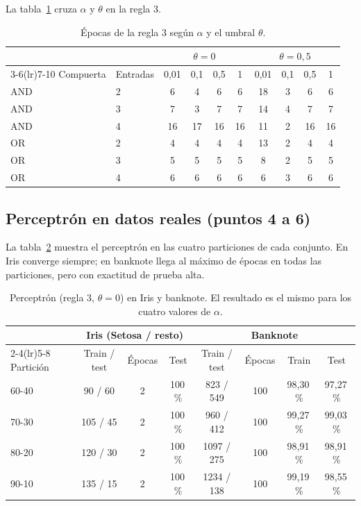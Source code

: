 \documentclass[11pt,letterpaper]{article}
\begin{document}
La tabla~\ref{tab:alfa} cruza $\alpha$ y $\theta$ en la regla 3.

\begin{table}[H]
\centering
\caption{Épocas de la regla 3 según $\alpha$ y el umbral $\theta$.}\label{tab:alfa}
\begin{tabular}{llcccccccc}
\toprule
& & \multicolumn{4}{c}{$\theta = 0$} & \multicolumn{4}{c}{$\theta = 0{,}5$} \\
\cmidrule(lr){3-6}\cmidrule(lr){7-10}
Compuerta & Entradas & 0,01 & 0,1 & 0,5 & 1 & 0,01 & 0,1 & 0,5 & 1 \\
\midrule
AND & 2 & 6 & 4 & 6 & 6 & 18 & 3 & 6 & 6 \\
AND & 3 & 7 & 3 & 7 & 7 & 14 & 4 & 7 & 7 \\
AND & 4 & 16 & 17 & 16 & 16 & 11 & 2 & 16 & 16 \\
OR & 2 & 4 & 4 & 4 & 4 & 13 & 2 & 4 & 4 \\
OR & 3 & 5 & 5 & 5 & 5 & 8 & 2 & 5 & 5 \\
OR & 4 & 6 & 6 & 6 & 6 & 6 & 3 & 6 & 6 \\
\bottomrule
\end{tabular}
\end{table}

\subsection{Perceptrón en datos reales (puntos 4 a 6)}

La tabla~\ref{tab:perc_datos} muestra el perceptrón en las cuatro particiones de cada conjunto. En Iris converge siempre; en banknote llega al máximo de épocas en todas las particiones, pero con exactitud de prueba alta.

\begin{table}[H]
\centering
\caption{Perceptrón (regla 3, $\theta = 0$) en Iris y banknote. El resultado es el mismo para los cuatro valores de $\alpha$.}\label{tab:perc_datos}
\begin{tabular}{lccccccc}
\toprule
& \multicolumn{3}{c}{Iris (Setosa / resto)} & \multicolumn{4}{c}{Banknote} \\
\cmidrule(lr){2-4}\cmidrule(lr){5-8}
Partición & Train / test & Épocas & Test & Train / test & Épocas & Train & Test \\
\midrule
60-40 & 90 / 60 & 2 & 100\,\% & 823 / 549 & 100 & 98,30\,\% & 97,27\,\% \\
70-30 & 105 / 45 & 2 & 100\,\% & 960 / 412 & 100 & 99,27\,\% & 99,03\,\% \\
80-20 & 120 / 30 & 2 & 100\,\% & 1097 / 275 & 100 & 98,91\,\% & 98,91\,\% \\
90-10 & 135 / 15 & 2 & 100\,\% & 1234 / 138 & 100 & 99,19\,\% & 98,55\,\% \\
\bottomrule
\end{tabular}
\end{table}
\end{document}
